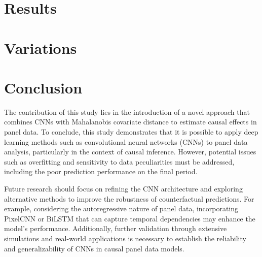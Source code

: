 \documentclass[12pt]{article}
\begin{document}
\section{Results}


\section{Variations}


\section{Conclusion}

The contribution of this study lies in the introduction of a novel approach that combines CNNs with Mahalanobis covariate distance to estimate causal effects in panel data.
To conclude, this study demonstrates that it is possible to apply deep learning methods such as convolutional neural networks (CNNs) to panel data analysis, 
particularly in the context of causal inference.
However, potential issues such as overfitting and sensitivity to data peculiarities must be addressed, including
the poor prediction performance on the final period.

Future research should focus on refining the CNN architecture and exploring alternative methods to improve the robustness of counterfactual predictions.
For example, considering the autoregressive nature of panel data, incorporating PixelCNN or BiLSTM that 
can capture temporal dependencies may enhance the model's performance.
Additionally, further validation through extensive simulations and real-world applications is necessary to establish the reliability and generalizability of CNNs in causal panel data models.

\newpage
\printbibliography
\end{document}
